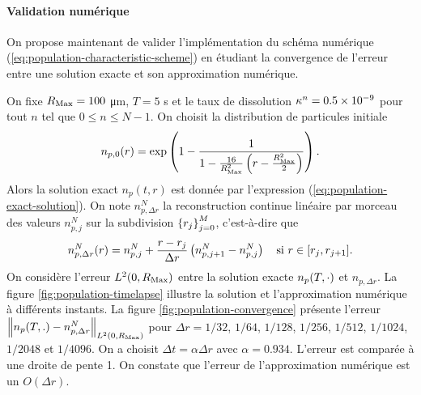 \paragraph{Validation numérique} On propose maintenant de valider
l'implémentation du schéma numérique
(\ref{eq:population-characteristic-scheme}) en étudiant la
convergence de l'erreur entre une solution exacte et son approximation
numérique.

On fixe $R_\mathrm{Max} = \num{100}$ \si{\micro\meter}, $T = 5$ \si{\second} et
le taux de dissolution
$\kappa^n = \num{0.5e-9}$ pour tout $n$ tel que $0\leq n\leq
N-1$. On choisit la distribution de particules initiale
\begin{equation}\label{eq:population-test-ic}
  n_{p,0}(r) = \exp\left( 1 - \frac{1}{1 - \frac{16}{R_\mathrm{Max}^2}\left( r - \frac{R_\mathrm{Max}^2}{2} \right)} \right).
\end{equation}
Alors la solution exact $n_p(t, r)$ est donnée par l'expression
(\ref{eq:population-exact-solution}). On note $n_{p,\Delta r}^N$ la
reconstruction continue linéaire par morceau des valeurs $n_{p,j}^N$
sur la subdivision $\left\{ r_j \right\}_{j=0}^M$, c'est-à-dire que
\begin{equation}
  n_{p,\Delta r}^N(r) = n_{p,j}^N + \frac{r - r_j}{\Delta
    r}\left( n_{p,j+1}^N - n_{p,j}^N \right)\quad \text{si } r\in[r_j, r_{j+1}].
\end{equation}
On considère l'erreur $L^2(0,R_\mathrm{Max})$ entre la solution exacte
$n_p(T, \cdot)$ et $n_{p,\Delta r}$. La figure
\ref{fig:population-timelapse} illustre la solution et l'approximation
numérique à différents instants. La figure
\ref{fig:population-convergence} présente l'erreur $\left\lVert n_p(T, .) -
  n_{p,\Delta r}^N \right\rVert_{L^2(0,R_\mathrm{Max})}$ pour $\Delta r = 1/32$, $1/64$,
$1/128$, $1/256$, $1/512$, $1/1024$, $1/2048$ et $1/4096$. On a
choisit $\Delta t = \alpha\Delta r$ avec $\alpha =
\num{0.934}$. L'erreur est comparée à une droite de pente 1. On
constate que l'erreur de l'approximation numérique est un $O(\Delta
r)$.


